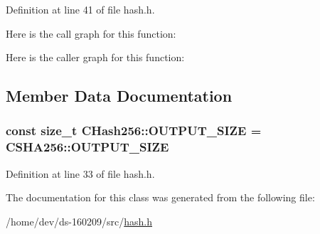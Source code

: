 Definition at line 41 of file hash.\+h.



Here is the call graph for this function\+:




Here is the caller graph for this function\+:




\subsection{Member Data Documentation}
\hypertarget{class_c_hash256_a6812a40441acb1c3b7f10c7e38c7d467}{}
\subsubsection[{O\+U\+T\+P\+U\+T\+\_\+\+S\+I\+Z\+E}]{\setlength{\rightskip}{0pt plus 5cm}const size\+\_\+t C\+Hash256\+::\+O\+U\+T\+P\+U\+T\+\_\+\+S\+I\+Z\+E = C\+S\+H\+A256\+::\+O\+U\+T\+P\+U\+T\+\_\+\+S\+I\+Z\+E\hspace{0.3cm}{\ttfamily [static]}}\label{class_c_hash256_a6812a40441acb1c3b7f10c7e38c7d467}


Definition at line 33 of file hash.\+h.



The documentation for this class was generated from the following file\+:\begin{DoxyCompactItemize}
\item 
/home/dev/ds-\/160209/src/\hyperlink{hash_8h}{hash.\+h}\end{DoxyCompactItemize}
